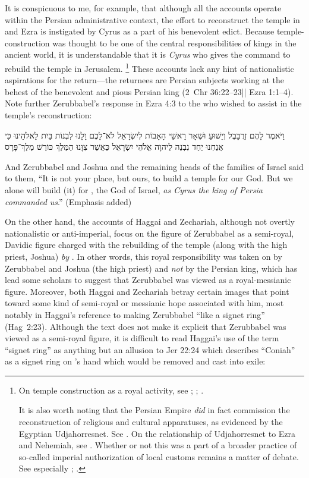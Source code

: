 It is conspicuous to me, for example, that although all the accounts operate within the Persian administrative context, the effort to reconstruct the temple in \chronicles and Ezra is instigated by Cyrus as a part of his benevolent edict. Because temple-construction was thought to be one of the central responsibilities of kings in the ancient world, it is understandable that it is \emph{Cyrus} who gives the command to rebuild the temple in Jerusalem.%
    \footnote{On temple construction as a royal activity, see
        \cite{kapelrud_orientalia1963};
        \cite{petersen_cbq1974};
        \cite{laato_zaw1994}.

        It is also worth noting that the Persian Empire \emph{did} in fact commission the reconstruction of religious and cultural apparatuses, as evidenced by the Egyptian Udjahorresnet. See 
            \cite{lloyd_jea1982}. On the relationship of Udjahorresnet to Ezra and Nehemiah, see 
            \cite{blenkinsopp_jbl1987}.
        Whether or not this was a part of a broader practice of so-called imperial authorization of local customs remains a matter of debate. See especially
            \cite{frei_frei1984};
            \cite{frei_watts2001}.}
These accounts lack any hint of nationalistic aspirations for the return---the returnees are Persian subjects working at the behest of the benevolent and pious Persian king (2~Chr 36:22--23|| Ezra 1:1--4). Note further Zerubbabel's response in Ezra 4:3 to the  who wished to assist in the temple's reconstruction:
\begin{hebrewtext}
    וַיֹּאמֶר לָהֶם זְרֻבָּבֶל וְיֵשׁוּעַ וּשְׁאָר רָאשֵׁי הָאָבוֹת לְיִשְׂרָאֵל לֹא־לָכֶם וָלָנוּ לִבְנוֹת בַּיִת לֵאלֹהֵינוּ כִּי אֲנַחְנוּ יַחַד נִבְנֶה לַיהוָה אֱלֹהֵי יִשְׂרָאֵל כַּאֲשֶׁר צִוָּנוּ הַמֶּלֶךְ כּוֹרֶשׁ מֶלֶךְ־פָּרָס
\end{hebrewtext}
\begin{translation}
    And Zerubbabel and Joshua and the remaining heads of the families of Israel said to them, ``It is not your place, but ours, to build a temple for our God. But we alone will build (it) for \yahweh, the God of Israel, \emph{as Cyrus the king of Persia commanded us}.'' (Emphasis added)
\end{translation}
\noindent
On the other hand, the accounts of Haggai and Zechariah, although not overtly nationalistic or anti-imperial, focus on the figure of Zerubbabel as a semi-royal, Davidic figure charged with the rebuilding of the temple (along with the high priest, Joshua) \emph{by \yahweh}. In other words, this royal responsibility was taken on by Zerubbabel and Joshua (the high priest) and \emph{not} by the Persian king, which has lead some scholars to suggest that Zerubbabel was viewed as a royal-messianic figure. Moreover, both Haggai and Zechariah betray certain images that point toward some kind of semi-royal or messianic hope associated with him, most notably in Haggai's reference to \yahweh making Zerubbabel ``like a signet ring'' (Hag~2:23). Although the text does not make it explicit that Zerubbabel was viewed as a semi-royal figure, it is difficult to read Haggai's use of the term ``signet ring'' as anything but an allusion to Jer 22:24 which describes ``Coniah'' as a signet ring on \yahweh's hand which would be removed and cast into exile:
